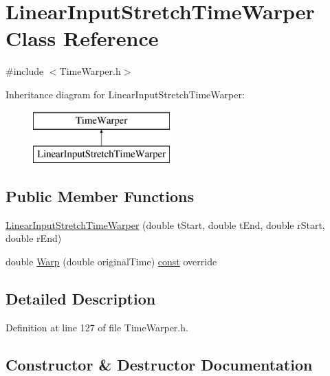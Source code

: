 \hypertarget{class_linear_input_stretch_time_warper}{}\section{Linear\+Input\+Stretch\+Time\+Warper Class Reference}
\label{class_linear_input_stretch_time_warper}


{\ttfamily \#include $<$Time\+Warper.\+h$>$}

Inheritance diagram for Linear\+Input\+Stretch\+Time\+Warper\+:\begin{figure}[H]
\begin{center}
\leavevmode
\includegraphics[height=2.000000cm]{class_linear_input_stretch_time_warper}
\end{center}
\end{figure}
\subsection*{Public Member Functions}
\begin{DoxyCompactItemize}
\item 
\hyperlink{class_linear_input_stretch_time_warper_affe79e48a1386794286dfbb14052c102}{Linear\+Input\+Stretch\+Time\+Warper} (double t\+Start, double t\+End, double r\+Start, double r\+End)
\item 
double \hyperlink{class_linear_input_stretch_time_warper_a90043df8df79b7638c142b4e046598fa}{Warp} (double original\+Time) \hyperlink{getopt1_8c_a2c212835823e3c54a8ab6d95c652660e}{const}  override
\end{DoxyCompactItemize}


\subsection{Detailed Description}


Definition at line 127 of file Time\+Warper.\+h.



\subsection{Constructor \& Destructor Documentation}
